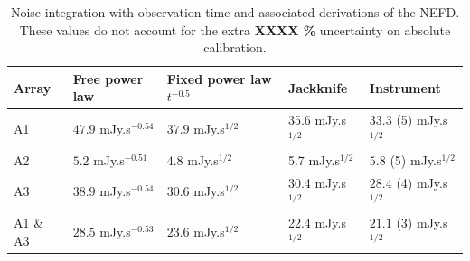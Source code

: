 \begin{table}
\begin{tabular}{|l|l|l|l|l|}
\hline
Array & Free power law & Fixed power law $t^{-0.5}$ & Jackknife & Instrument \\
\hline
A1       & $47.9$ mJy.s$^{-0.54}$ & $37.9$ mJy.s$^{1/2}$ & 35.6 mJy.s$^{1/2}$ & $33.3$ (5) mJy.s$^{1/2}$\\
A2       & $5.2$  mJy.s$^{-0.51}$ & $4.8$  mJy.s$^{1/2}$ & 5.7  mJy.s$^{1/2}$ & $5.8$  (5) mJy.s$^{1/2}$\\
A3       & $38.9$ mJy.s$^{-0.54}$ & $30.6$ mJy.s$^{1/2}$ & 30.4 mJy.s$^{1/2}$ & $28.4$ (4) mJy.s$^{1/2}$\\
A1 \& A3 & $28.5$ mJy.s$^{-0.53}$ & $23.6$ mJy.s$^{1/2}$ & 22.4 mJy.s$^{1/2}$ & $21.1$ (3) mJy.s$^{1/2}$\\
\hline
\end{tabular}
\label{tab:nefd}
\caption{Noise integration with observation time and associated derivations of
  the NEFD. These values do not account for the extra {\color{red} \bf XXXX \%}
  uncertainty on absolute calibration.}
\end{table}


